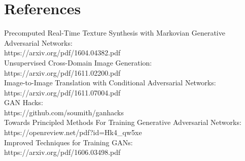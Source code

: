 \documentclass{article} %
\begin{document}
\section{References}

Precomputed Real-Time Texture Synthesis with Markovian Generative Adversarial Networks: \\ 
\quad https://arxiv.org/pdf/1604.04382.pdf \\ 

Unsupervised Cross-Domain Image Generation: \\ 
\quad https://arxiv.org/pdf/1611.02200.pdf \\ 

Image-to-Image Translation with Conditional Adversarial Networks: \\ 
\quad https://arxiv.org/pdf/1611.07004.pdf \\ 

GAN Hacks:  \\ 
\quad https://github.com/soumith/ganhacks \\ 

Towards Principled Methods For Training Generative Adversarial Networks: \\ 
\quad https://openreview.net/pdf?id=Hk4\_qw5xe \\ 

Improved Techniques for Training GANs: \\ 
\quad https://arxiv.org/pdf/1606.03498.pdf \\ 

\end{document}
